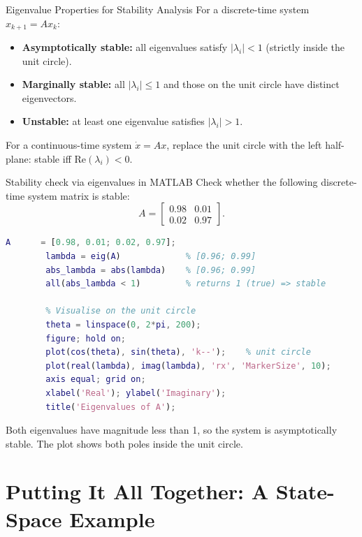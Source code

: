 \begin{defnbox}{Eigenvalue Properties for Stability Analysis}
	For a discrete-time system $x_{k+1} = A x_k$:
	\begin{itemize}[noitemsep]
		\item \textbf{Asymptotically stable:} all eigenvalues satisfy
		$|\lambda_i| < 1$ (strictly inside the unit circle).
		\item \textbf{Marginally stable:} all $|\lambda_i| \leq 1$ and
		those on the unit circle have distinct eigenvectors.
		\item \textbf{Unstable:} at least one eigenvalue satisfies
		$|\lambda_i| > 1$.
	\end{itemize}
	For a continuous-time system $\dot{x} = Ax$, replace the unit circle
	with the left half-plane: stable iff $\mathrm{Re}(\lambda_i) < 0$.
\end{defnbox}

\begin{examplebox}{Stability check via eigenvalues in MATLAB}
	Check whether the following discrete-time system matrix is stable:
	\[
	A = \begin{bmatrix} 0.98 & 0.01 \\ 0.02 & 0.97 \end{bmatrix}.
	\]
	
	\solution
	\begin{lstlisting}[language=Matlab]
		A      = [0.98, 0.01; 0.02, 0.97];
		lambda = eig(A)             % [0.96; 0.99]
		abs_lambda = abs(lambda)    % [0.96; 0.99]
		all(abs_lambda < 1)         % returns 1 (true) => stable
		
		% Visualise on the unit circle
		theta = linspace(0, 2*pi, 200);
		figure; hold on;
		plot(cos(theta), sin(theta), 'k--');    % unit circle
		plot(real(lambda), imag(lambda), 'rx', 'MarkerSize', 10);
		axis equal; grid on;
		xlabel('Real'); ylabel('Imaginary');
		title('Eigenvalues of A');
	\end{lstlisting}
	Both eigenvalues have magnitude less than 1, so the system is
	asymptotically stable.  The plot shows both poles inside the unit
	circle.
\end{examplebox}

\section{Putting It All Together: A State-Space Example}
\label{sec:app_together}


